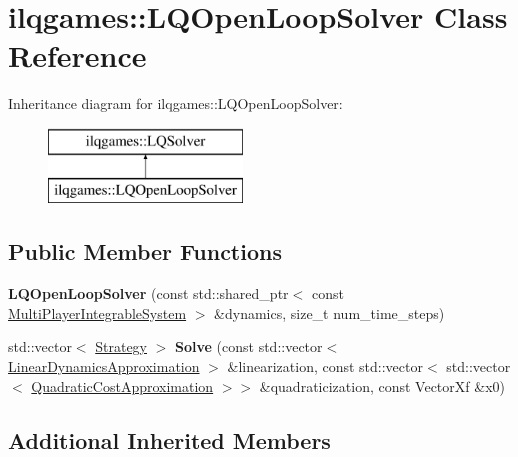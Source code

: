 \hypertarget{classilqgames_1_1_l_q_open_loop_solver}{}\section{ilqgames\+:\+:L\+Q\+Open\+Loop\+Solver Class Reference}
\label{classilqgames_1_1_l_q_open_loop_solver}
Inheritance diagram for ilqgames\+:\+:L\+Q\+Open\+Loop\+Solver\+:\begin{figure}[H]
\begin{center}
\leavevmode
\includegraphics[height=2.000000cm]{classilqgames_1_1_l_q_open_loop_solver}
\end{center}
\end{figure}
\subsection*{Public Member Functions}
\begin{DoxyCompactItemize}
\item 
{\bfseries L\+Q\+Open\+Loop\+Solver} (const std\+::shared\+\_\+ptr$<$ const \hyperlink{classilqgames_1_1_multi_player_integrable_system}{Multi\+Player\+Integrable\+System} $>$ \&dynamics, size\+\_\+t num\+\_\+time\+\_\+steps)\hypertarget{classilqgames_1_1_l_q_open_loop_solver_a77e32ee045b0136d5813d3c70c025ca6}{}\label{classilqgames_1_1_l_q_open_loop_solver_a77e32ee045b0136d5813d3c70c025ca6}

\item 
std\+::vector$<$ \hyperlink{structilqgames_1_1_strategy}{Strategy} $>$ {\bfseries Solve} (const std\+::vector$<$ \hyperlink{structilqgames_1_1_linear_dynamics_approximation}{Linear\+Dynamics\+Approximation} $>$ \&linearization, const std\+::vector$<$ std\+::vector$<$ \hyperlink{structilqgames_1_1_quadratic_cost_approximation}{Quadratic\+Cost\+Approximation} $>$$>$ \&quadraticization, const Vector\+Xf \&x0)\hypertarget{classilqgames_1_1_l_q_open_loop_solver_a956833ee7cd4283210a36d94e2e744c2}{}\label{classilqgames_1_1_l_q_open_loop_solver_a956833ee7cd4283210a36d94e2e744c2}

\end{DoxyCompactItemize}
\subsection*{Additional Inherited Members}


